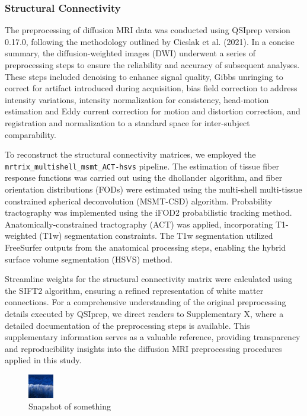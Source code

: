\documentclass{cys}
\begin{document}
\bigskip

\subsubsection{Structural Connectivity}

The preprocessing of diffusion MRI data was conducted using QSIprep version 0.17.0, following the methodology outlined by Cieslak et al. (2021). In a concise summary, the diffusion-weighted images (DWI) underwent a series of preprocessing steps to ensure the reliability and accuracy of subsequent analyses. These steps included denoising to enhance signal quality, Gibbs unringing to correct for artifact introduced during acquisition, bias field correction to address intensity variations, intensity normalization for consistency, head-motion estimation and Eddy current correction for motion and distortion correction, and registration and normalization to a standard space for inter-subject comparability.

\bigskip
To reconstruct the structural connectivity matrices, we employed the \texttt{mrtrix\_multishell\_msmt\_ACT-hsvs} pipeline. The estimation of tissue fiber response functions was carried out using the dhollander algorithm, and fiber orientation distributions (FODs) were estimated using the multi-shell multi-tissue constrained spherical deconvolution (MSMT-CSD) algorithm. Probability tractography was implemented using the iFOD2 probabilistic tracking method. Anatomically-constrained tractography (ACT) was applied, incorporating T1-weighted (T1w) segmentation constraints. The T1w segmentation utilized FreeSurfer outputs from the anatomical processing steps, enabling the hybrid surface volume segmentation (HSVS) method.

\bigskip
Streamline weights for the structural connectivity matrix were calculated using the SIFT2 algorithm, ensuring a refined representation of white matter connections. For a comprehensive understanding of the original preprocessing details executed by QSIprep, we direct readers to Supplementary X, where a detailed documentation of the preprocessing steps is available. This supplementary information serves as a valuable reference, providing transparency and reproducibility insights into the diffusion MRI preprocessing procedures applied in this study.

\begin{figure}[ht]
\centering
\includegraphics[width=0.1\textwidth]{foto.JPG}
\caption{Snapshot of something}
\label{jdm1}
\end{figure}
\end{document}
